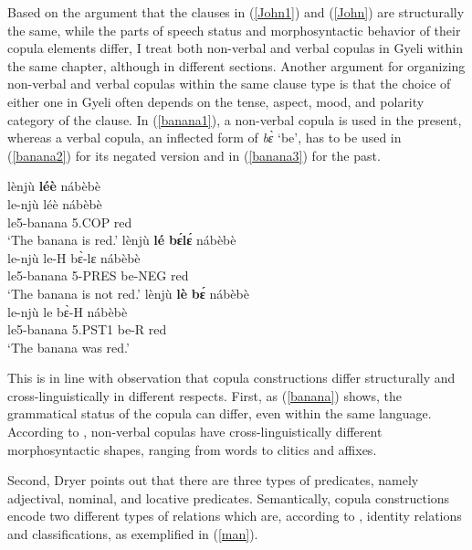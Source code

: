 Based on the argument that the clauses in (\ref{John1}) and (\ref{John}) are structurally the same, while the parts of speech status and morphosyntactic behavior of their copula elements differ, I treat both non-verbal and verbal copulas in Gyeli within the same chapter, although in different sections. Another argument for organizing non-verbal and verbal copulas within the same clause type is that the choice of either one in Gyeli often depends on the tense, aspect, mood, and polarity category of the clause. In (\ref{banana1}), a non-verbal copula is used in the present, whereas a verbal copula, an inflected form of {\itshape bɛ̀} `be', has to be used in (\ref{banana2}) for its negated version and in (\ref{banana3}) for the past.

\begin{exe}
\ex\label{banana}
\begin{xlist}
\ex\label{banana1}
  \glll lènjù {\bfseries léè} nábèbè   \\
        le-njù léè nábèbè  \\
          le5-banana 5.COP red  \\
    \trans `The banana is red.'
\ex\label{banana2}
  \glll lènjù {\bfseries lé} {\bfseries bɛ́lɛ́} nábèbè   \\
        le-njù le-H bɛ̀-lɛ nábèbè  \\
          le5-banana 5-PRES be-NEG red  \\
    \trans `The banana is not red.'
\ex\label{banana3}
  \glll lènjù {\bfseries lè} {\bfseries bɛ́} nábèbè   \\
        le-njù le bɛ̀-H nábèbè  \\
          le5-banana 5.PST1 be-R red  \\
    \trans `The banana was red.'
\end{xlist}
\end{exe}

This is in line with  observation that copula constructions differ structurally and cross-linguistically in different respects. First, as (\ref{banana}) shows, the grammatical status of the copula can differ, even within the same language. According to \citet[225-227]{dryer2007a}, non-verbal copulas have cross-linguistically different morphosyntactic shapes, ranging from words to clitics and affixes. 

Second, Dryer points out that there are three types of predicates, namely adjectival, nominal, and locative predicates. 
Semantically, copula constructions encode two different types of relations which are, according to \citet[1-2]{curnow2001}, identity relations and classifications, as exemplified in (\ref{man}).

